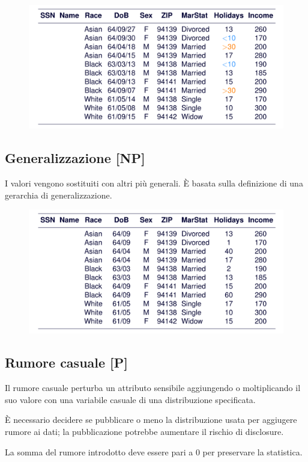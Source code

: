 \documentclass{report}
\begin{document}
\begin{figure}[ht]
    \centering
    \includegraphics[width=0.75\linewidth]{images/top-bottom.png}
\end{figure}

\subsection{Generalizzazione [NP]}
I valori vengono sostituiti con altri più generali. È basata 
sulla definizione di una gerarchia di generalizzazione.

\begin{figure}[ht]
    \centering
    \includegraphics[width=0.75\linewidth]{images/gener.png}
\end{figure}

\subsection{Rumore casuale [P]}
Il rumore casuale perturba un attributo sensibile aggiungendo o moltiplicando 
il suo valore con una variabile casuale di una distribuzione specificata.

È necessario decidere se pubblicare o meno la distribuzione usata per aggiugere rumore ai dati;
la pubblicazione potrebbe aumentare il rischio di disclosure.

La somma del rumore introdotto deve essere pari a 0 per preservare la statistica.
\end{document}
